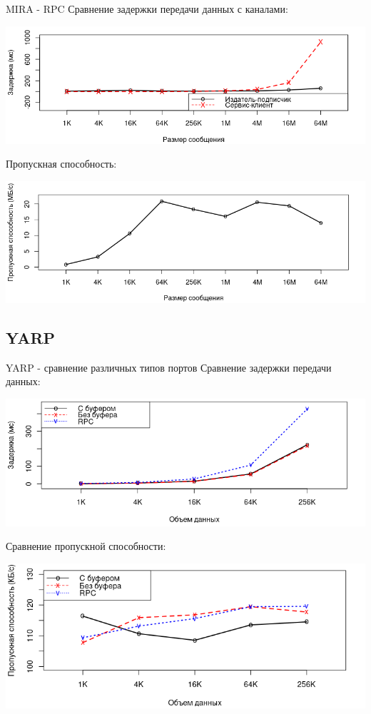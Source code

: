\begin{frame}{MIRA - RPC}
	Сравнение задержки передачи данных с каналами:
	\begin{center}
		\includegraphics[width=.8\textwidth]{img/mira/mira_res_rpc_pubsub.png}
	\end{center}
	Пропускная способность:
	\begin{center}
		\includegraphics[width=.8\textwidth]{img/mira/mira_res_rpc_bps.png}
	\end{center}
\end{frame}

\subsection{YARP}
\begin{frame}{YARP - сравнение различных типов портов}
	Сравнение задержки передачи данных:
	\begin{center}
		\includegraphics[width=.8\textwidth]{img/yarp/yarp_ports_l.png}
	\end{center}
	Сравнение пропускной способности:
	\begin{center}
		\includegraphics[width=.8\textwidth]{img/yarp/yarp_ports_bw.png}
	\end{center}
\end{frame}

